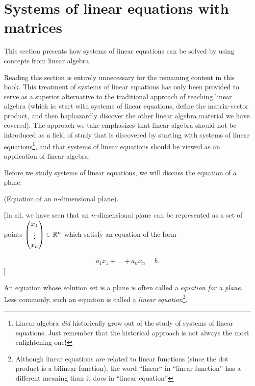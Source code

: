 \newpage

\section{Systems of linear equations with matrices}

This section presents how systems of linear equations can be solved by using concepts from linear algebra.

Reading this section is entirely unnecessary for the remaining content in this book. This treatment of systems of linear equations has only been provided to serve as a superior alternative to the traditional approach of teaching linear algebra (which is: start with systems of linear equations, define the matrix-vector product, and then haphazardly discover the other linear algebra material we have covered). The approach we take emphasizes that linear algebra should not be introduced as a field of study that is discovered by starting with systems of linear equations\footnote{Linear algebra \textit{did} historically grow out of the study of systems of linear equations. Just remember that the historical approach is not always the most enlightening one!}, and that systems of linear equations should be viewed as an application of linear algebra.

Before we study systems of linear equations, we will discuss the equation of a plane.

\begin{deriv}
    (Equation of an $n$-dimensional plane).
    
    [In all, we have seen that an $n$-dimensional plane can be represented as a set of points $\begin{pmatrix} x_1 \\ \vdots \\ x_n \end{pmatrix} \in \mathbb{R}^n$ which satisfy an equation of the form
    
    \begin{align*}
        a_1 x_1 + ... + a_n x_n = b.
    \end{align*}
    ]
    
    An equation whose solution set is a plane is often called a \textit{equation for a plane}. Less commonly, such an equation is called a \textit{linear equation}\footnote{Although linear equations are related to linear functions (since the dot product is a bilinear function), the word ``linear`` in ``linear function'' has a different meaning than it does in ``linear equation''}. 
\end{deriv}

